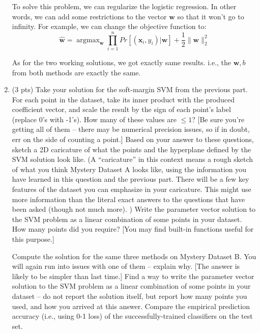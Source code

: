 \documentclass[10pt,letter,notitlepage]{article}
\newcommand{\argmax}{\mathop{\mathrm{argmax}}}
\newcommand{\wv}{\mathbf{w}}
\newcommand{\xv}{\mathbf{x}}
\newcounter{exercise}
\begin{document}
\begin{exercise}
\begin{enumerate}
{  To solve this problem, we can regularize the logistic regression. In other words, we can add some restrictions to the vector $\wv$ so that it won't go to infinity. 
  For example, we can change the objective function to:
  $$
  \hat{\wv} = \argmax_{\wv} \prod_{i=1}^{n} Pr[(\xv_i, y_i) | \wv] + \frac{1}{2} \|\wv\|_2^2
  $$

  As for the two working solutions, we got exactly same results. i.e., the $\wv, b$ from both methods are exactly the same.
} 

\item (3 pts) Take your solution for the soft-margin SVM from the previous part.
For each point in the dataset, take its inner product with the produced coefficient vector, and scale the result by the sign of each point's label (replace 0's with -1's). How many of these values are $\leq 1$? [Be sure you're getting all of them -- there may be numerical precision issues, so if in doubt, err on the side of counting a point.]
Based on your answer to these questions, sketch a 2D caricature of what the points and the hyperplane defined by the SVM solution look like.
    (A ``caricature'' in this context means a rough sketch of what you think Mystery Dataset A looks like, using the information you have learned in this question and the previous part. 
    There will be a few key features of the dataset you can emphasize in your caricature.
    This might use more information than the literal exact answers to the questions that have been asked (though not much more).
    ) 
Write the parameter vector solution to the SVM problem as a linear combination of some points in your dataset.
How many points did you require?
[You may find built-in functions useful for this purpose.]

Compute the solution for the same three methods on Mystery Dataset B. 
You will again run into issues with one of them -- explain why. [The answer is likely to be simpler than last time.]
Find a way to write the parameter vector solution to the SVM problem as a linear combination of some points in your dataset -- do not report the solution itself, but report how many points you used, and how you arrived at this answer.
Compare the empirical prediction accuracy (i.e., using 0-1 loss) of the successfully-trained classifiers on the test set. 


\end{enumerate}
\end{exercise}
\end{document}

